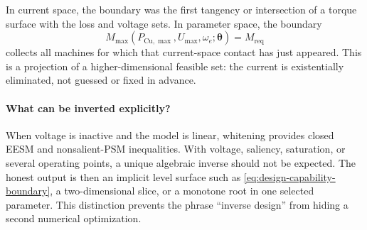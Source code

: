 In current space, the boundary was the first tangency or intersection of a
torque surface with the loss and voltage sets.  In parameter space, the
boundary
\begin{equation}
 M_{\max}(P_{\mathrm{Cu},\max},U_{\max},\omega_e;
 \boldsymbol\theta)=M_{\mathrm{req}}
 \label{eq:design-capability-boundary}
\end{equation}
collects all machines for which that current-space contact has just appeared.
This is a projection of a higher-dimensional feasible set: the current is
existentially eliminated, not guessed or fixed in advance.

\paragraph{What can be inverted explicitly?}
When voltage is inactive and the model is linear, whitening provides closed
EESM and nonsalient-PSM inequalities.  With voltage, saliency, saturation, or
several operating points, a unique algebraic inverse should not be expected.
The honest output is then an implicit level surface such as
\cref{eq:design-capability-boundary}, a two-dimensional slice, or a monotone
root in one selected parameter.  This distinction prevents the phrase
``inverse design'' from hiding a second numerical optimization.

